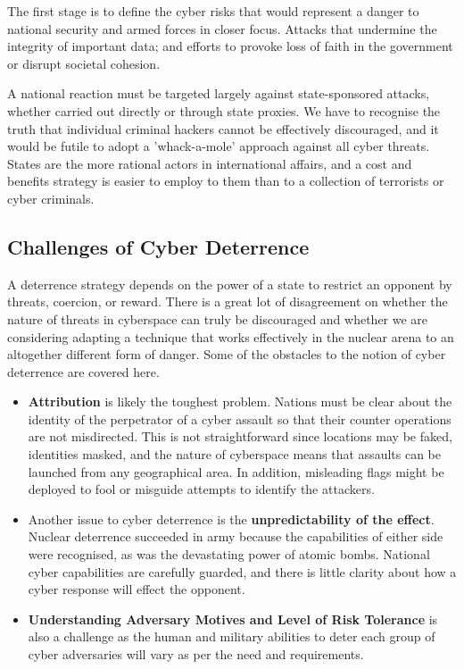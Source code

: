 \documentclass{article}
\begin{document}
The first stage is to define the cyber risks that would represent a danger to national security and armed forces in closer focus. Attacks that undermine the integrity of important data; and efforts to provoke loss of faith in the government or disrupt societal cohesion.

A national reaction must be targeted largely against state-sponsored attacks, whether carried out directly or through state proxies. We have to recognise the truth that individual criminal hackers cannot be effectively discouraged, and it would be futile to adopt a 'whack-a-mole' approach against all cyber threats. States are the more rational actors in international affairs, and a cost and benefits strategy is easier to employ to them than to a collection of terrorists or cyber criminals.

\subsection{Challenges of Cyber Deterrence}
A deterrence strategy depends on the power of a state to restrict an opponent by threats, coercion, or reward. There is a great lot of disagreement on whether the nature of threats in cyberspace can truly be discouraged and whether we are considering adapting a technique that works effectively in the nuclear arena to an altogether different form of danger. Some of the obstacles to the notion of cyber deterrence are covered here.

\begin{itemize}
\item \textbf{Attribution} is likely the toughest problem. Nations must be clear about the identity of the perpetrator of a cyber assault so that their counter operations are not misdirected. This is not straightforward since locations may be faked, identities masked, and the nature of cyberspace means that assaults can be launched from any geographical area. In addition, misleading flags might be deployed to fool or misguide attempts to identify the attackers.
\item Another issue to cyber deterrence is the \textbf{unpredictability of the effect}. Nuclear deterrence succeeded in army because the capabilities of either side were recognised, as was the devastating power of atomic bombs. National cyber capabilities are carefully guarded, and there is little clarity about how a cyber response will effect the opponent.
\item \textbf{Understanding Adversary Motives and Level of Risk Tolerance} is also a challenge as the human and military abilities to deter each group of cyber adversaries
will vary as per the need and requirements.
\end{itemize}
\end{document}
